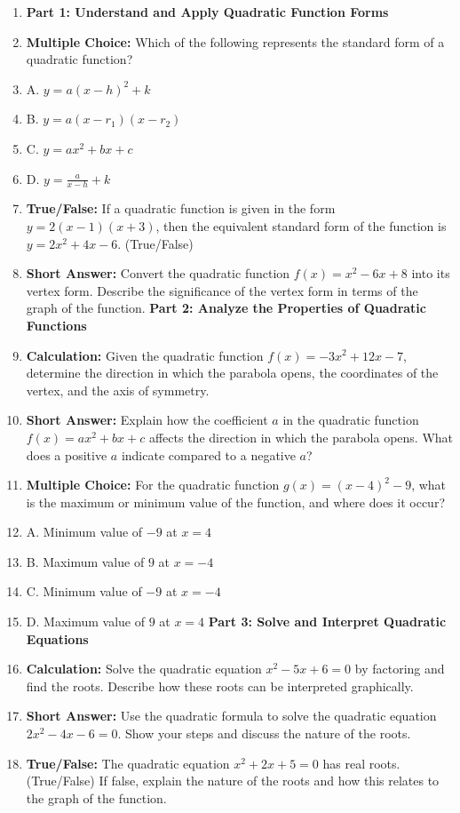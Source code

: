 \begin{enumerate}
    \item \textbf{Part 1: Understand and Apply Quadratic Function Forms}
    \item \textbf{Multiple Choice:} Which of the following represents the standard form of a quadratic function?
    \item A. $y = a(x - h)^2 + k$
    \item B. $y = a(x - r_1)(x - r_2)$
    \item C. $y = ax^2 + bx + c$
    \item D. $y = \frac{a}{x - h} + k$
    \item \textbf{True/False:} If a quadratic function is given in the form $y = 2(x - 1)(x + 3)$, then the equivalent standard form of the function is $y = 2x^2 + 4x - 6$. (True/False)
    \item \textbf{Short Answer:} Convert the quadratic function $f(x) = x^2 - 6x + 8$ into its vertex form. Describe the significance of the vertex form in terms of the graph of the function. \textbf{Part 2: Analyze the Properties of Quadratic Functions}
    \item \textbf{Calculation:} Given the quadratic function $f(x) = -3x^2 + 12x - 7$, determine the direction in which the parabola opens, the coordinates of the vertex, and the axis of symmetry.
    \item \textbf{Short Answer:} Explain how the coefficient $a$ in the quadratic function $f(x) = ax^2 + bx + c$ affects the direction in which the parabola opens. What does a positive $a$ indicate compared to a negative $a$?
    \item \textbf{Multiple Choice:} For the quadratic function $g(x) = (x - 4)^2 - 9$, what is the maximum or minimum value of the function, and where does it occur?
    \item A. Minimum value of $-9$ at $x = 4$
    \item B. Maximum value of $9$ at $x = -4$
    \item C. Minimum value of $-9$ at $x = -4$
    \item D. Maximum value of $9$ at $x = 4$ \textbf{Part 3: Solve and Interpret Quadratic Equations}
    \item \textbf{Calculation:} Solve the quadratic equation $x^2 - 5x + 6 = 0$ by factoring and find the roots. Describe how these roots can be interpreted graphically.
    \item \textbf{Short Answer:} Use the quadratic formula to solve the quadratic equation $2x^2 - 4x - 6 = 0$. Show your steps and discuss the nature of the roots.
    \item \textbf{True/False:} The quadratic equation $x^2 + 2x + 5 = 0$ has real roots. (True/False) If false, explain the nature of the roots and how this relates to the graph of the function.
\end{enumerate}

